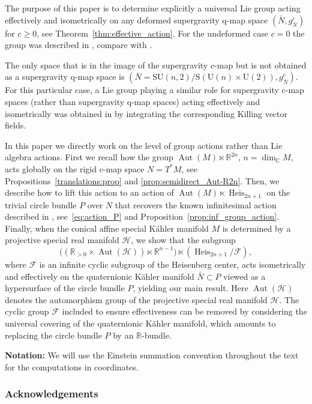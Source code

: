 \documentclass{article}
\theoremstyle{definition}
\DeclareMathOperator{\Aut}{Aut}
\DeclareMathOperator{\Heis}{Heis}
\newcommand{\R}{\mathbb{R}}
\newcommand{\C}{\mathbb{C}}
\newcommand{\calF}{\mathcal{F}}
\newcommand{\calH}{\mathcal{H}}
\newcommand{\SU}{\mathrm{SU}}
\begin{document}
    The purpose of this paper is to determine explicitly a universal Lie group acting effectively and isometrically on any deformed supergravity q-map space $(\bar{N},g_{\bar{N}}^c)$ for $c\geq0$, see Theorem~\ref{thm:effective_action}. For the undeformed case $c=0$ the group was described in \cite[Appendix~A]{CDJL21}, compare with \cite{dWVVP93,dWVP95}.\medskip
    
    The only space that is in the image of the supergravity c-map but is not obtained as a supergravity q-map space is $(\bar{N}=\SU(n,2)/\mathrm{S}(\mathrm{U}(n)\times\mathrm{U}(2)),g_{\bar{N}}^c)$. For this particular case, a Lie group playing a similar role for supergravity c-map spaces (rather than supergravity q-map spaces) acting effectively and isometrically was obtained in \cite{CRT21} by integrating the corresponding Killing vector fields.\medskip
    
    In this paper we directly work on the level of group actions rather than Lie algebra actions. First we recall how the group $\Aut(M)\ltimes\R^{2n}$, $n=\dim_\C M$, acts globally on the rigid c-map space $N=T^*M$, see Propositions~\ref{translations:prop} and \ref{prop:semidirect_Aut-R2n}. Then, we describe how to lift this action to an action of $\Aut(M)\ltimes\Heis_{2n+1}$ on the trivial circle bundle $P$ over $N$ that recovers the known infinitesimal action described in \cite{CST21}, see~\eqref{eq:action_P} and Proposition~\ref{prop:inf_group_action}. Finally, when the conical affine special K\"ahler manifold $M$ is determined by a projective special real manifold $\calH$, we show that the subgroup $$\big((\R_{>0}\times\Aut(\calH))\ltimes\R^{n-1}\big)\ltimes(\Heis_{2n+1}/\calF),$$ where $\calF$ is an infinite cyclic subgroup of the Heisenberg center, acts isometrically and effectively on the quaternionic K\"ahler manifold $\bar{N}\subset P$ viewed as a hypersurface of the circle bundle $P$, yielding our main result. Here $\Aut(\calH)$ denotes the automorphism group of the projective special real manifold $\calH$. The cyclic group $\calF$ included to ensure effectiveness can be removed by considering the universal covering of the quaternionic K\"ahler manifold, which amounts to replacing the circle bundle $P$ by an $\mathbb{R}$-bundle.\medskip
    
    \textbf{Notation:} We will use the Einstein summation convention throughout the text for the computations in coordinates.
    
    \subsubsection*{Acknowledgements}
    
\end{document}
